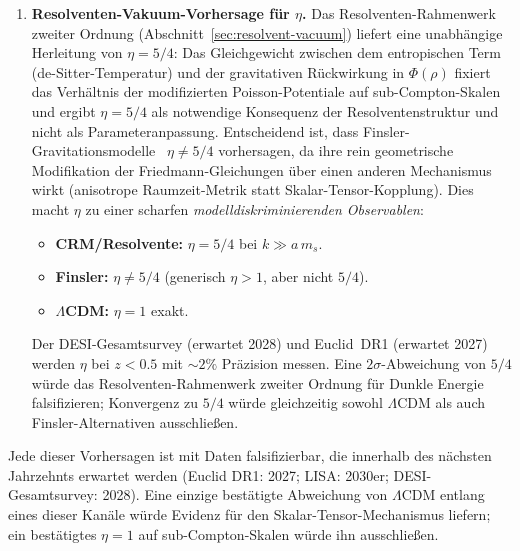 \documentclass[12pt,a4paper]{article}
\theoremstyle{definition}
\theoremstyle{plain}
\theoremstyle{remark}
\begin{document}
\begin{enumerate}
  \item \textbf{Resolventen-Vakuum-Vorhersage f\"ur $\eta$.}\;
        Das Resolventen-Rahmenwerk zweiter Ordnung
        (Abschnitt~\ref{sec:resolvent-vacuum}) liefert eine unabh\"angige
        Herleitung von $\eta = 5/4$: Das Gleichgewicht zwischen dem
        entropischen Term (de-Sitter-Temperatur) und der gravitativen
        R\"uckwirkung in $\Phi(\rho)$ fixiert das Verh\"altnis der
        modifizierten Poisson-Potentiale auf sub-Compton-Skalen und
        ergibt $\eta = 5/4$ als notwendige Konsequenz der
        Resolventenstruktur und nicht als Parameteranpassung.
        Entscheidend ist, dass
        Finsler-Gravitationsmodelle~\cite{FinslerJCAP2025}
        $\eta \neq 5/4$ vorhersagen, da ihre rein geometrische
        Modifikation der Friedmann-Gleichungen \"uber einen anderen
        Mechanismus wirkt (anisotrope Raumzeit-Metrik statt
        Skalar-Tensor-Kopplung). Dies macht $\eta$ zu einer scharfen
        \emph{modelldiskriminierenden Observablen}:
        \begin{itemize}
          \item \textbf{CRM/Resolvente:} $\eta = 5/4$ bei $k \gg a\,m_s$.
          \item \textbf{Finsler:} $\eta \neq 5/4$ (generisch $\eta > 1$,
                aber nicht $5/4$).
          \item \textbf{$\Lambda$CDM:} $\eta = 1$ exakt.
        \end{itemize}
        Der DESI-Gesamtsurvey (erwartet 2028) und Euclid~DR1 (erwartet
        2027) werden $\eta$ bei $z < 0.5$ mit
        $\sim 2\%$ Pr\"azision messen. Eine $2\sigma$-Abweichung von
        $5/4$ w\"urde das Resolventen-Rahmenwerk zweiter Ordnung f\"ur
        Dunkle Energie falsifizieren; Konvergenz zu $5/4$ w\"urde
        gleichzeitig sowohl $\Lambda$CDM als auch
        Finsler-Alternativen ausschlie\ss en.
\end{enumerate}

Jede dieser Vorhersagen ist mit Daten falsifizierbar, die innerhalb des
n\"achsten Jahrzehnts erwartet werden (Euclid DR1: 2027; LISA: 2030er;
DESI-Gesamtsurvey: 2028). Eine einzige best\"atigte Abweichung von
$\Lambda$CDM entlang eines dieser Kan\"ale w\"urde Evidenz f\"ur den
Skalar-Tensor-Mechanismus liefern; ein best\"atigtes $\eta = 1$ auf
sub-Compton-Skalen w\"urde ihn ausschlie\ss en.
\end{document}
